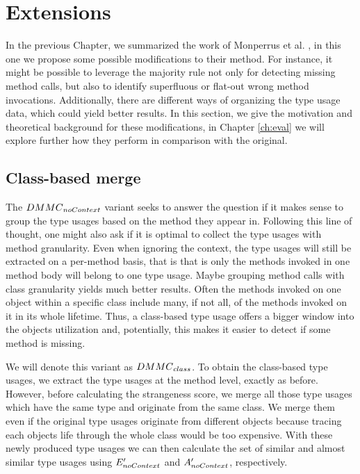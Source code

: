 \chapter{Extensions}\label{ch:ext}

In the previous Chapter, we summarized the work of Monperrus et al. \cite{monperrus2010detecting}\cite{monperrus2013detecting}, in this one we propose some possible modifications to their method.
For instance, it might be possible to leverage the majority rule not only for detecting missing method calls, but also to identify superfluous or flat-out wrong method invocations.
Additionally, there are different ways of organizing the type usage data, which could yield better results.
In this section, we give the motivation and theoretical background for these modifications, in Chapter \ref{ch:eval} we will explore further how they perform in comparison with the original.

\section{Class-based merge}

The $\mathnormal{DMMC}_{\mathnormal{noContext}}$ variant seeks to answer the question if it makes sense to group the type usages based on the method they appear in.
Following this line of thought, one might also ask if it is optimal to collect the type usages with method granularity.
Even when ignoring the context, the type usages will still be extracted on a per-method basis, that is that is only the methods invoked in one method body will belong to one type usage.
Maybe grouping method calls with class granularity yields much better results.
Often the methods invoked on one object within a specific class include many, if not all, of the methods invoked on it in its whole lifetime.
Thus, a class-based type usage offers a bigger window into the objects utilization and, potentially, this makes it easier to detect if some method is missing.

We will denote this variant as $\mathnormal{DMMC}_{\mathnormal{class}}$.
To obtain the class-based type usages, we extract the type usages at the method level, exactly as before.
However, before calculating the strangeness score, we merge all those type usages which have the same type and originate from the same class.
We merge them even if the original type usages originate from different objects because tracing each objects life through the whole class would be too expensive.
With these newly produced type usages we can then calculate the set of similar and almost similar type usages using $E'_{\mathnormal{noContext}}$ and $A'_{\mathnormal{noContext}}$, respectively.

